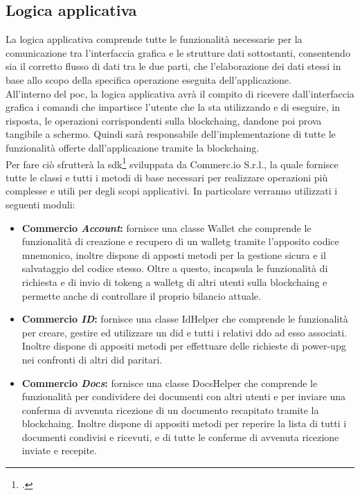 \subsection{Logica applicativa}

La logica applicativa comprende tutte le funzionalità necessarie per la comunicazione tra l'interfaccia grafica e le strutture dati sottostanti, consentendo sia il corretto flusso di dati tra le due parti, che l'elaborazione dei dati stessi in base allo scopo della specifica operazione eseguita dell'applicazione.\\
All'interno del \gls{poc}, la logica applicativa avrà il compito di ricevere dall'interfaccia grafica i comandi che impartisce l'utente che la sta utilizzando e di eseguire, in risposta, le operazioni corrispondenti sulla \gls{blockchaing}, dandone poi prova tangibile a schermo. Quindi sarà responsabile dell'implementazione di tutte le funzionalità offerte dall'applicazione tramite la \gls{blockchaing}.\\
Per fare ciò sfrutterà la \gls{sdk}\footcite{manual:sdk-commercio-network} sviluppata da Commerc.io S.r.l., la quale fornisce tutte le classi e tutti i metodi di base necessari per realizzare operazioni più complesse e utili per degli scopi applicativi. In particolare verranno utilizzati i seguenti moduli:

\begin{itemize}
	\item \textbf{Commercio \textit{Account}:} fornisce una classe Wallet che comprende le funzionalità di creazione e recupero di un \gls{walletg} tramite l'apposito codice mnemonico, inoltre dispone di apposti metodi per la gestione sicura e il salvataggio del codice stesso. Oltre a questo, incapsula le funzionalità di richiesta e di invio di \gls{tokeng} a \gls{walletg} di altri utenti sulla \gls{blockchaing} e permette anche di controllare il proprio bilancio attuale. 
	\item \textbf{Commercio \textit{ID}:} fornisce una classe IdHelper che comprende le funzionalità per creare, gestire ed utilizzare un \gls{did} e tutti i relativi \gls{ddo} ad esso associati. Inoltre dispone di appositi metodi per effettuare delle richieste di \gls{power-upg} nei confronti di altri \gls{did} paritari.
	\item \textbf{Commercio \textit{Docs}:} fornisce una classe DocsHelper che comprende le funzionalità per condividere dei documenti con altri utenti e per inviare una conferma di avvenuta ricezione di un documento recapitato tramite la \gls{blockchaing}. Inoltre dispone di appositi metodi per reperire la lista di tutti i documenti condivisi e ricevuti, e di tutte le conferme di avvenuta ricezione inviate e recepite.
\end{itemize} 

